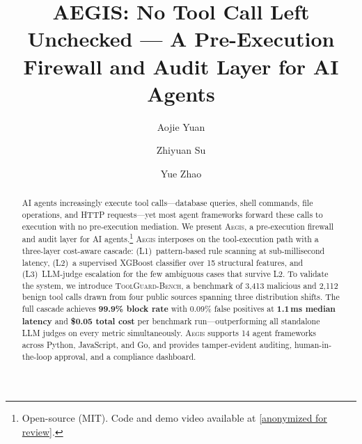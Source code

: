 \documentclass[sigconf,anonymous]{acmart}
\newcommand{\system}{\textsc{Aegis}\xspace}
\newcommand{\bench}{\textsc{ToolGuard-Bench}\xspace}
\begin{document}

\title{AEGIS: No Tool Call Left Unchecked --- A Pre-Execution Firewall and Audit Layer for AI Agents}

\author{Aojie Yuan}

\author{Zhiyuan Su}

\author{Yue Zhao}

\begin{abstract}
AI agents increasingly execute tool calls---database queries, shell commands, file operations, and HTTP requests---yet most agent frameworks forward these calls to execution with no pre-execution mediation.
We present \system, a pre-execution firewall and audit layer for AI agents.\footnote{Open-source (MIT). Code and demo video available at \url{[anonymized for review]}.}
\system interposes on the tool-execution path with a three-layer cost-aware cascade: (L1)~pattern-based rule scanning at sub-millisecond latency, (L2)~a supervised XGBoost classifier over 15 structural features, and (L3)~LLM-judge escalation for the few ambiguous cases that survive L2.
To validate the system, we introduce \bench, a benchmark of 3{,}413 malicious and 2{,}112 benign tool calls drawn from four public sources spanning three distribution shifts.
The full cascade achieves \textbf{99.9\% block rate} with 0.09\% false positives at \textbf{1.1\,ms median latency} and \textbf{\$0.05 total cost} per benchmark run---outperforming all standalone LLM judges on every metric simultaneously.
\system supports 14 agent frameworks across Python, JavaScript, and Go, and provides tamper-evident auditing, human-in-the-loop approval, and a compliance dashboard.
\end{abstract}


\maketitle
\end{document}
